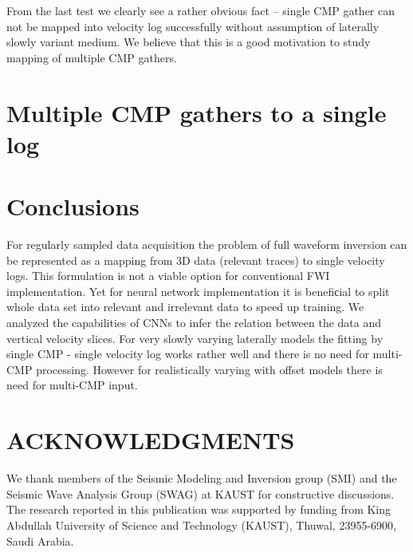 \documentclass[manuscript]{geophysics}
\begin{document}
From the last test we clearly see a rather obvious fact -- single CMP gather can not be mapped into velocity log successfully without assumption of laterally slowly variant medium. We believe that this is a good motivation to study mapping of multiple CMP gathers.

\section{Multiple CMP gathers to a single log}

\section{Conclusions}
For regularly sampled data acquisition the problem of full waveform inversion can be represented as a mapping from 3D data (relevant traces) to single velocity logs. This formulation is not a viable option for conventional FWI implementation. Yet for neural network implementation it is benefiсial to split whole data set into relevant and irrelevant data to speed up training.  
We analyzed the capabilities of CNNs to infer the relation between the data and vertical velocity slices. For very slowly varying laterally models the fitting by single CMP - single velocity log works rather well and there is no need for multi-CMP processing. However for realistically varying with offset models there is need for multi-CMP input. 


\section{ACKNOWLEDGMENTS}

We thank members of the Seismic Modeling and Inversion group (SMI) and the Seismic Wave Analysis Group (SWAG) at KAUST for constructive discussions.
The research reported in this publication was supported by funding from King Abdullah University of Science and Technology (KAUST), Thuwal, 23955-6900, Saudi Arabia.




\newpage


\end{document}
